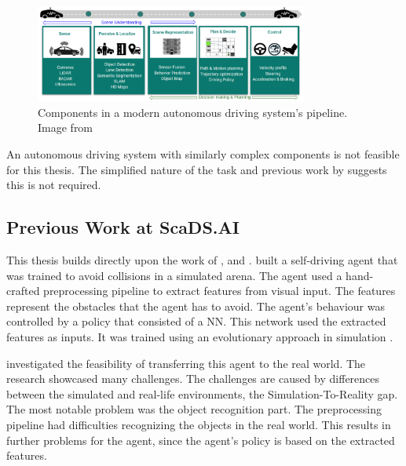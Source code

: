 \begin{figure}
    \centering
    \includegraphics[width=0.8\textwidth]{Bilder/ad_components_from_paper_drl_for_ad.png}
    \caption{Components in a modern autonomous driving system's pipeline. Image from \textcite{drl_for_ad}}
    \label{fig:ad_components}
\end{figure}

An autonomous driving system with similarly complex components is not feasible for this thesis. The simplified nature of the task and previous work by \textcite{maximilian} suggests this is not required.


\subsection{Previous Work at ScaDS.AI}
This thesis builds directly upon the work of \textcite{jonas_koenig}, \textcite{merlin_flach} and \textcite{maximilian}. 
\textcite{jonas_koenig} built a self-driving agent that was trained to avoid collisions in a simulated arena. The agent used a hand-crafted preprocessing pipeline to extract features from visual input. The features represent the obstacles that the agent has to avoid. The agent's behaviour was controlled by a policy that consisted of a \ac{NN}. This network used the extracted features as inputs. It was trained using an evolutionary approach in simulation .

\textcite{merlin_flach} investigated the feasibility of transferring this agent to the real world. The research showcased many challenges. The challenges are caused by differences between the simulated and real-life environments, the Simulation-To-Reality gap. The most notable problem was the object recognition part. The preprocessing pipeline had difficulties recognizing the objects in the real world. This results in further problems for the agent, since the agent's policy is based on the extracted features.

